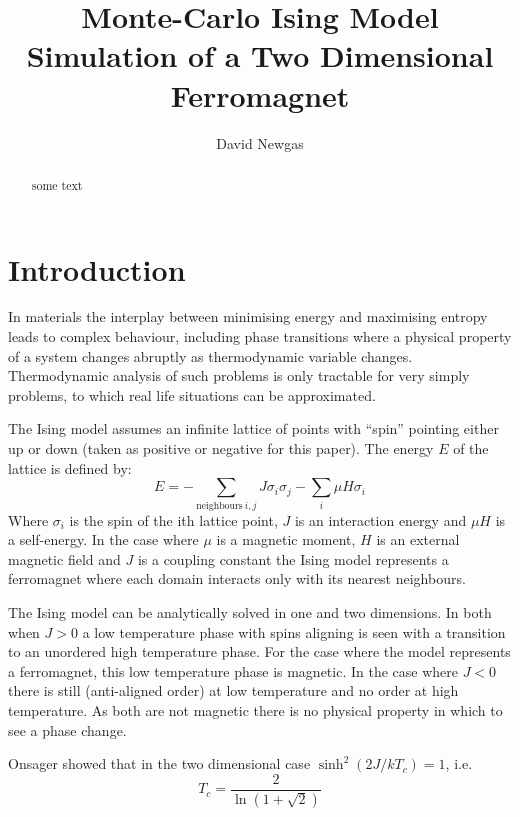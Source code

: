 \documentclass[12pt,a4paper,english]{article}
\author{David Newgas}
\title{Monte-Carlo Ising Model Simulation of a Two Dimensional Ferromagnet}
\begin{document}
\maketitle

\begin{abstract}
some text
\end{abstract}

\section{Introduction}
\label{sec:introduction}
In materials the interplay between minimising energy and maximising entropy leads to complex behaviour, including phase transitions where a physical property of a system changes abruptly as thermodynamic variable changes.  Thermodynamic analysis of such problems is only tractable for very simply problems, to which real life situations can be approximated.

The Ising model assumes an infinite lattice of points with ``spin'' pointing either up or down (taken as positive or negative for this paper).  The energy $E$ of the lattice is defined by:
\begin{equation}
\label{eqn:ising-energy}
E = - \sum_{\mathrm{neighbours}\: i,j} J \sigma_i \sigma_j - \sum_i \mu H \sigma_i
\end{equation}
Where $\sigma_i$ is the spin of the ith lattice point, $J$ is an interaction energy and $\mu H$ is a self-energy.  In the case where $\mu$ is a magnetic moment, $H$ is an external magnetic field and $J$ is a coupling constant the Ising model represents a ferromagnet where each domain interacts only with its nearest neighbours.

The Ising model can be analytically solved in one and two dimensions.  In both when $J>0$ a low temperature phase with spins aligning is seen with a transition to an unordered high temperature phase.  For the case where the model represents a ferromagnet, this low temperature phase is magnetic.  In the case where $J<0$ there is still (anti-aligned order) at low temperature and no order at high temperature.  As both are not magnetic there is no physical property in which to see a phase change.

Onsager \cite{onsager44} showed that in the two dimensional case $\sinh^2 \left(2J/kT_c\right)=1$, i.e.
\begin{equation}
\label{eqn:T-c}
T_c= \frac{2} {\ln \left( 1 + \sqrt{2}\right)}
\end{equation}
\end{document}
